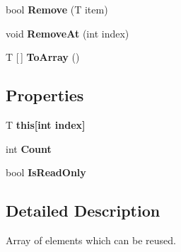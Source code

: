 \begin{DoxyCompactItemize}
\mbox{\label{class_r_j_c_p_1_1_datastructures_1_1_reusable_list_a27e00519e369e6e7815d8baa5f0eded3}} 
bool {\bfseries Remove} (T item)
\item 
\mbox{\label{class_r_j_c_p_1_1_datastructures_1_1_reusable_list_acb1b3ee36afc1e16edbdcf10881fb2a6}} 
void {\bfseries Remove\+At} (int index)
\item 
\mbox{\label{class_r_j_c_p_1_1_datastructures_1_1_reusable_list_af53e676bbb8d1f1001c8487ec759f3b4}} 
T \mbox{[}$\,$\mbox{]} {\bfseries To\+Array} ()
\end{DoxyCompactItemize}
\subsection*{Properties}
\begin{DoxyCompactItemize}
\item 
\mbox{\label{class_r_j_c_p_1_1_datastructures_1_1_reusable_list_ae784ec2d33e8e50151c298c0efc39286}} 
T {\bfseries this\mbox{[}int index\mbox{]}}
\item 
\mbox{\label{class_r_j_c_p_1_1_datastructures_1_1_reusable_list_a2f1c12876b161dde1e56e4cb8bf70194}} 
int {\bfseries Count}
\item 
\mbox{\label{class_r_j_c_p_1_1_datastructures_1_1_reusable_list_a97a754360a4d49c1eb18dd788d572554}} 
bool {\bfseries Is\+Read\+Only}
\end{DoxyCompactItemize}


\subsection{Detailed Description}
Array of elements which can be reused. 


